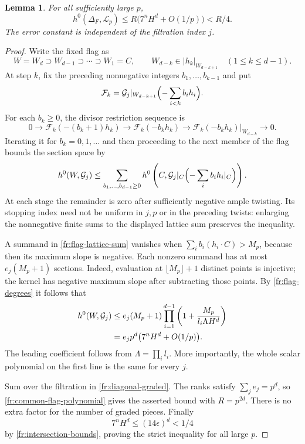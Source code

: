 \documentclass[12pt,a4paper,psamsfonts]{amsart}
\theoremstyle{definition}
\theoremstyle{plain}
\newtheorem{lemma}{Lemma}[section]
\begin{document}
\begin{lemma}\label{fr:diagonal-sections}
For all sufficiently large $p$,
\[
 h^0(\Delta_F,\mathcal L_p)
 \le R\bigl(7^nH^d+O(1/p)\bigr)<R/4.
\]
The error constant is independent of the filtration index $j$.
\end{lemma}

\begin{proof}
Write the fixed flag as
\[
 W=W_d\supset W_{d-1}\supset\cdots\supset W_1=C,
 \qquad W_{d-k}\in|h_k|_{W_{d-k+1}}
 \quad(1\le k\le d-1).
\]
At step $k$, fix the preceding nonnegative integers
$b_1,\ldots,b_{k-1}$ and put
\[
 \mathcal F_k=
 \mathcal G_j|_{W_{d-k+1}}
 \Bigl(-\sum_{i<k}b_i h_i\Bigr).
\]
For each $b_k\ge0$, the divisor restriction sequence is
\[
 0\longrightarrow\mathcal F_k(-(b_k+1)h_k)
 \longrightarrow\mathcal F_k(-b_kh_k)
 \longrightarrow
 \mathcal F_k(-b_kh_k)|_{W_{d-k}}
 \longrightarrow0.
\]
Iterating it for $b_k=0,1,\ldots$ and then proceeding to the next
member of the flag bounds the section space by
\begin{equation}\label{fr:flag-lattice-sum}
 h^0(W,\mathcal G_j)\le
 \sum_{b_1,\ldots,b_{d-1}\ge0}
 h^0\left(C,\mathcal G_j|_C\Bigl(-\sum_i b_i h_i|_C\Bigr)\right).
\end{equation}
At each stage the remainder is zero after sufficiently negative
ample twisting.  Its stopping index need not be uniform in $j,p$
or in the preceding twists: enlarging the nonnegative finite sums
to the displayed lattice sum preserves the inequality.

A summand in \eqref{fr:flag-lattice-sum} vanishes when
$\sum_i b_i(h_i\cdot C)>M_p$, because then its maximum slope is
negative.  Each nonzero summand has at most $e_j(M_p+1)$ sections.
Indeed, evaluation at $\lfloor M_p\rfloor+1$ distinct points is injective;
the kernel has negative maximum slope after subtracting those
points.  By \eqref{fr:flag-degrees} it follows that
\begin{align}
 h^0(W,\mathcal G_j)
 &\le e_j(M_p+1)
       \prod_{i=1}^{d-1}
       \left(1+\frac{M_p}{l_i\Lambda H^d}\right)\notag\\
 &=e_jp^d\bigl(7^nH^d+O(1/p)\bigr).
 \label{fr:common-flag-polynomial}
\end{align}
The leading coefficient follows from
$\Lambda=\prod_i l_i$.  More importantly, the whole scalar
polynomial on the first line is the same for every $j$.

Sum over the filtration in \eqref{fr:diagonal-graded}.  The ranks
satisfy $\sum_j e_j=p^d$, so \eqref{fr:common-flag-polynomial} gives
the asserted bound with $R=p^{2d}$.  There is no extra factor for
the number of graded pieces.  Finally
\[
 7^nH^d\le(14\epsilon)^d<1/4
\]
by \eqref{fr:intersection-bounds}, proving the strict inequality
for all large $p$.
\end{proof}
\end{document}
